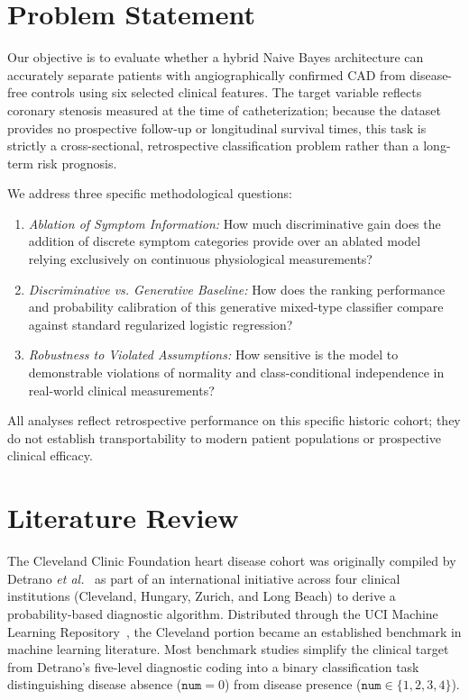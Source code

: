 \documentclass[conference]{IEEEtran}
\begin{document}
\section{Problem Statement}
Our objective is to evaluate whether a hybrid Naive Bayes architecture can accurately separate patients with angiographically confirmed CAD from disease-free controls using six selected clinical features. The target variable reflects coronary stenosis measured at the time of catheterization; because the dataset provides no prospective follow-up or longitudinal survival times, this task is strictly a cross-sectional, retrospective classification problem rather than a long-term risk prognosis.

We address three specific methodological questions:
\begin{enumerate}
\item \textit{Ablation of Symptom Information:} How much discriminative gain does the addition of discrete symptom categories provide over an ablated model relying exclusively on continuous physiological measurements?
\item \textit{Discriminative vs. Generative Baseline:} How does the ranking performance and probability calibration of this generative mixed-type classifier compare against standard regularized logistic regression?
\item \textit{Robustness to Violated Assumptions:} How sensitive is the model to demonstrable violations of normality and class-conditional independence in real-world clinical measurements?
\end{enumerate}
All analyses reflect retrospective performance on this specific historic cohort; they do not establish transportability to modern patient populations or prospective clinical efficacy.

\section{Literature Review}
The Cleveland Clinic Foundation heart disease cohort was originally compiled by Detrano \textit{et al.}~\cite{detrano1989} as part of an international initiative across four clinical institutions (Cleveland, Hungary, Zurich, and Long Beach) to derive a probability-based diagnostic algorithm. Distributed through the UCI Machine Learning Repository~\cite{uci}, the Cleveland portion became an established benchmark in machine learning literature. Most benchmark studies simplify the clinical target from Detrano's five-level diagnostic coding into a binary classification task distinguishing disease absence ($\texttt{num}=0$) from disease presence ($\texttt{num}\in\{1,2,3,4\}$).
\end{document}
